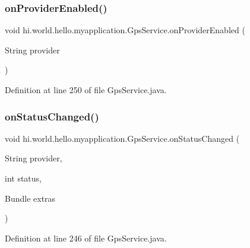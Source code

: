 \subsubsection{\texorpdfstring{onProviderEnabled()}{onProviderEnabled()}}
{\footnotesize\ttfamily void hi.\+world.\+hello.\+myapplication.\+Gps\+Service.\+on\+Provider\+Enabled (\begin{DoxyParamCaption}\item[{String}]{provider }\end{DoxyParamCaption})}



Definition at line 250 of file Gps\+Service.\+java.


\begin{DoxyCode}{0}

\end{DoxyCode}
\mbox{\label{classhi_1_1world_1_1hello_1_1myapplication_1_1_gps_service_a843192b623fde60337b2ab0b253392b7}} 
\subsubsection{\texorpdfstring{onStatusChanged()}{onStatusChanged()}}
{\footnotesize\ttfamily void hi.\+world.\+hello.\+myapplication.\+Gps\+Service.\+on\+Status\+Changed (\begin{DoxyParamCaption}\item[{String}]{provider,  }\item[{int}]{status,  }\item[{Bundle}]{extras }\end{DoxyParamCaption})}



Definition at line 246 of file Gps\+Service.\+java.


\begin{DoxyCode}{0}

\end{DoxyCode}
\mbox{\label{classhi_1_1world_1_1hello_1_1myapplication_1_1_gps_service_af0aab7413bb674828f99d498c5c50de7}} 
